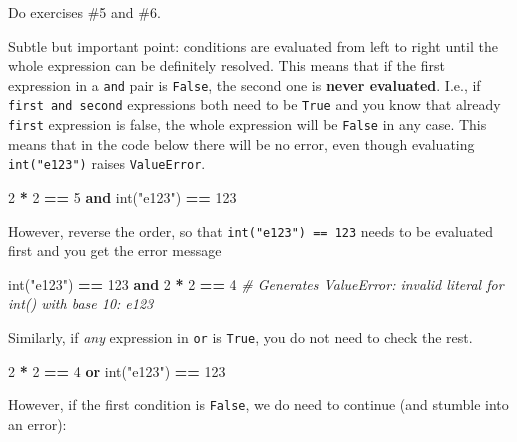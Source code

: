 \documentclass[
]{book}
\newenvironment{Shaded}{\begin{snugshade}}{\end{snugshade}}
\newcommand{\BuiltInTok}[1]{#1}
\newcommand{\CommentTok}[1]{\textcolor[rgb]{0.56,0.35,0.01}{\textit{#1}}}
\newcommand{\DecValTok}[1]{\textcolor[rgb]{0.00,0.00,0.81}{#1}}
\newcommand{\KeywordTok}[1]{\textcolor[rgb]{0.13,0.29,0.53}{\textbf{#1}}}
\newcommand{\NormalTok}[1]{#1}
\newcommand{\OperatorTok}[1]{\textcolor[rgb]{0.81,0.36,0.00}{\textbf{#1}}}
\newcommand{\StringTok}[1]{\textcolor[rgb]{0.31,0.60,0.02}{#1}}
\begin{document}
Do exercises \#5 and \#6.

Subtle but important point: conditions are evaluated from left to right until the whole expression can be definitely resolved. This means that if the first expression in a \texttt{and} pair is \texttt{False}, the second one is \textbf{never evaluated}. I.e., if \texttt{first\ and\ second} expressions both need to be \texttt{True} and you know that already \texttt{first} expression is false, the whole expression will be \texttt{False} in any case. This means that in the code below there will be no error, even though evaluating \texttt{int("e123")} raises \texttt{ValueError}.

\begin{Shaded}
\begin{Highlighting}[]
\DecValTok{2} \OperatorTok{*} \DecValTok{2} \OperatorTok{==} \DecValTok{5} \KeywordTok{and} \BuiltInTok{int}\NormalTok{(}\StringTok{"e123"}\NormalTok{) }\OperatorTok{==} \DecValTok{123}
\end{Highlighting}
\end{Shaded}

However, reverse the order, so that \texttt{int("e123")\ ==\ 123} needs to be evaluated first and you get the error message

\begin{Shaded}
\begin{Highlighting}[]
\BuiltInTok{int}\NormalTok{(}\StringTok{"e123"}\NormalTok{) }\OperatorTok{==} \DecValTok{123} \KeywordTok{and} \DecValTok{2} \OperatorTok{*} \DecValTok{2} \OperatorTok{==} \DecValTok{4}
\CommentTok{\# Generates ValueError: invalid literal for int() with base 10: \textquotesingle{}e123\textquotesingle{}}
\end{Highlighting}
\end{Shaded}

Similarly, if \emph{any} expression in \texttt{or} is \texttt{True}, you do not need to check the rest.

\begin{Shaded}
\begin{Highlighting}[]
\DecValTok{2} \OperatorTok{*} \DecValTok{2} \OperatorTok{==} \DecValTok{4} \KeywordTok{or} \BuiltInTok{int}\NormalTok{(}\StringTok{"e123"}\NormalTok{) }\OperatorTok{==} \DecValTok{123}
\end{Highlighting}
\end{Shaded}

However, if the first condition is \texttt{False}, we do need to continue (and stumble into an error):
\end{document}
